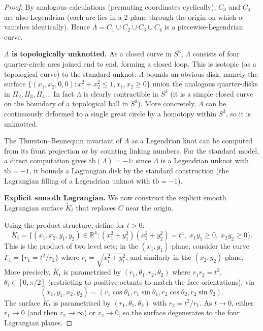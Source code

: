 \documentclass[12pt]{article}
\theoremstyle{definition}
\begin{document}
\begin{proof}
By analogous calculations (permuting coordinates cyclically), $C_3$ and $C_4$ are also Legendrian (each arc lies in a $2$-plane through the origin on which $\alpha$ vanishes identically). Hence $\Lambda = C_1 \cup C_2 \cup C_3 \cup C_4$ is a piecewise-Legendrian curve.

\medskip
\noindent\textbf{$\Lambda$ is topologically unknotted.} As a closed curve in $S^3$, $\Lambda$ consists of four quarter-circle arcs joined end to end, forming a closed loop. This is isotopic (as a topological curve) to the standard unknot: $\Lambda$ bounds an obvious disk, namely the surface $\{(x_1,x_2,0,0): x_1^2+x_2^2 \leq 1, x_1,x_2 \geq 0\}$ union the analogous quarter-disks in $\Pi_2,\Pi_3,\Pi_4$... In fact $\Lambda$ is clearly contractible in $S^3$ (it is a simple closed curve on the boundary of a topological ball in $S^3$). More concretely, $\Lambda$ can be continuously deformed to a single great circle by a homotopy within $S^3$, so it is unknotted.

The Thurston--Bennequin invariant of $\Lambda$ as a Legendrian knot can be computed from its front projection or by counting linking numbers. For the standard model, a direct computation gives $\text{tb}(\Lambda) = -1$: since $\Lambda$ is a Legendrian unknot with $\text{tb}=-1$, it bounds a Lagrangian disk by the standard construction (the Lagrangian filling of a Legendrian unknot with $\text{tb}=-1$).

\medskip
\noindent\textbf{Explicit smooth Lagrangian.} We now construct the explicit smooth Lagrangian surface $\tilde{K}_t$ that replaces $C$ near the origin.

Using the product structure, define for $t > 0$:
\begin{equation}
\label{eq:product_surface}
  \tilde{K}_t = \{(x_1, x_2, y_1, y_2) \in \mathbb{R}^4 :
    (x_1^2 + y_1^2)(x_2^2 + y_2^2) = t^4, \;
    x_1 y_1 \geq 0, \; x_2 y_2 \geq 0\}.
\end{equation}
This is the product of two level sets: in the $(x_1,y_1)$-plane, consider the curve $\Gamma_1 = \{r_1 = t^2/r_2\}$ where $r_i = \sqrt{x_i^2+y_i^2}$, and similarly in the $(x_2,y_2)$-plane. More precisely, $\tilde{K}_t$ is parametrised by $(r_1, \theta_1, r_2, \theta_2)$ where $r_1 r_2 = t^2$, $\theta_i \in [0,\pi/2]$ (restricting to positive octants to match the face orientations), via
\[
  (x_1, y_1, x_2, y_2) = (r_1 \cos\theta_1, r_1\sin\theta_1, r_2\cos\theta_2, r_2\sin\theta_2).
\]
The surface $\tilde{K}_t$ is parametrised by $(r_1, \theta_1, \theta_2)$ with $r_2 = t^2/r_1$. As $t\to 0$, either $r_1\to 0$ (and then $r_2\to\infty$) or $r_2\to 0$, so the surface degenerates to the four Lagrangian planes.


\end{proof}
\end{document}
